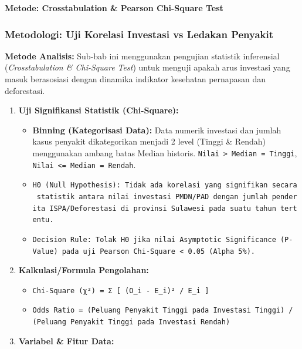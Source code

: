 \documentclass[
]{article}
\providecommand{\tightlist}{%
  \setlength{\itemsep}{0pt}\setlength{\parskip}{0pt}}
\begin{document}
\textbf{Metode: Crosstabulation \& Pearson Chi-Square Test}

\subsubsection{Metodologi: Uji Korelasi Investasi vs Ledakan
Penyakit}\label{metodologi-uji-korelasi-investasi-vs-ledakan-penyakit}

\textbf{Metode Analisis:} Sub-bab ini menggunakan pengujian statistik
inferensial (\emph{Crosstabulation \& Chi-Square Test}) untuk menguji
apakah arus investasi yang masuk berasosiasi dengan dinamika indikator
kesehatan pernapasan dan deforestasi.

\begin{enumerate}
\def\labelenumi{\arabic{enumi}.}
\tightlist
\item
  \textbf{Uji Signifikansi Statistik (Chi-Square):}

  \begin{itemize}
  \tightlist
  \item
    \textbf{Binning (Kategorisasi Data):} Data numerik investasi dan
    jumlah kasus penyakit dikategorikan menjadi 2 level (Tinggi \&
    Rendah) menggunakan ambang batas Median historis.
    \texttt{Nilai\ \textgreater{}\ Median\ =\ Tinggi},
    \texttt{Nilai\ \textless{}=\ Median\ =\ Rendah}.
  \item
    \texttt{H0\ (Null\ Hypothesis):\ Tidak\ ada\ korelasi\ yang\ signifikan\ secara\ statistik\ antara\ nilai\ investasi\ PMDN/PAD\ dengan\ jumlah\ penderita\ ISPA/Deforestasi\ di\ provinsi\ Sulawesi\ pada\ suatu\ tahun\ tertentu.}
  \item
    \texttt{Decision\ Rule:\ Tolak\ H0\ jika\ nilai\ Asymptotic\ Significance\ (P-Value)\ pada\ uji\ Pearson\ Chi-Square\ \textless{}\ 0.05\ (Alpha\ 5\%).}
  \end{itemize}
\item
  \textbf{Kalkulasi/Formula Pengolahan:}

  \begin{itemize}
  \tightlist
  \item
    \texttt{Chi-Square\ (χ²)\ =\ Σ\ {[}\ (O\_i\ -\ E\_i)²\ /\ E\_i\ {]}}
  \item
    \texttt{Odds\ Ratio\ =\ (Peluang\ Penyakit\ Tinggi\ pada\ Investasi\ Tinggi)\ /\ (Peluang\ Penyakit\ Tinggi\ pada\ Investasi\ Rendah)}
  \end{itemize}
\item
  \textbf{Variabel \& Fitur Data:}


\end{enumerate}
\end{document}
